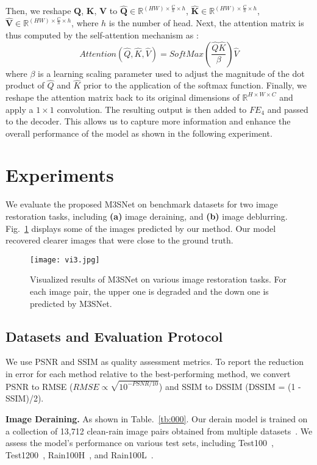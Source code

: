\documentclass[sn-mathphys,Numbered]{sn-jnl}
\theoremstyle{thmstyleone}\newtheorem{theorem}{Theorem}\newtheorem{proposition}[theorem]{Proposition}
\theoremstyle{thmstyletwo}\newtheorem{example}{Example}\newtheorem{remark}{Remark}
\theoremstyle{thmstylethree}\newtheorem{definition}{Definition}
\begin{document}
Then, we reshape $\mathbf{Q}$, $\mathbf{K}$, $\mathbf{V}$ to $\mathbf{\hat{Q}} \in \mathbb R^{(H W) \times \frac{C}{h} \times h}$, $\mathbf{\hat{K}} \in \mathbb R^{(H W) \times \frac{C}{h} \times h}$, $\mathbf{\hat{V}} \in \mathbb R^{(H W) \times \frac{C}{h} \times h}$, where $h$ is the number of head.
Next, the attention matrix is thus computed by the self-attention mechanism  as :
\begin{equation}
	\label{equ:10}
    Attention(\hat{Q}, \hat{K}, \hat{V}) =  SoftMax(\frac{\hat{Q}\hat{K}}{\beta})\hat{V} 
\end{equation}
where $\beta$ is a learning scaling parameter used to adjust the magnitude of the dot product of $\hat{Q}$ and $\hat{K}$ prior to the application of the softmax function. Finally, we reshape the attention matrix back to its original dimensions of $\mathbb R^{H \times W \times C}$ and apply a $1 \times 1$ convolution. The resulting output is then added to $FE_4$ and passed to the decoder. This allows us to capture more information and enhance the overall performance of the model as shown in the following experiment.

\section{Experiments}
We evaluate the proposed M3SNet on benchmark datasets  for two image restoration tasks, including \textbf{(a)} image deraining, and \textbf{(b)} image deblurring. Fig.~\ref{fig:05} displays some of the images predicted by our method. Our model recovered clearer images that were close to the ground truth.

\begin{figure} \centerline{\texttt{[image: vi3.jpg]}}
	\caption{Visualized results of M3SNet on various image restoration tasks. For each image pair, the upper one is degraded and the down one is predicted by M3SNet.
}
	\label{fig:05}
\end{figure}

\subsection{Datasets and  Evaluation Protocol}
We use PSNR and SSIM as quality assessment metrics. To report the reduction in error for each method relative to the best-performing method, we convert PSNR to RMSE ($RMSE \propto \sqrt{10^{-PSNR/10}}$) and SSIM to DSSIM (DSSIM = (1 - SSIM)/2).

\noindent\textbf{Image Deraining.} As shown in Table.~\ref{tb:000}. Our derain model is trained on a collection of 13,712 clean-rain image pairs obtained from multiple datasets~\cite{238099669,81Yang2016DeepJR,90Zhang2017ImageDU,DIDMDN}. We assess the model's performance on various test sets, including Test100~\cite{90Zhang2017ImageDU}, Test1200~\cite{DIDMDN}, Rain100H~\cite{81Yang2016DeepJR}, and Rain100L~\cite{81Yang2016DeepJR}.
\end{document}
